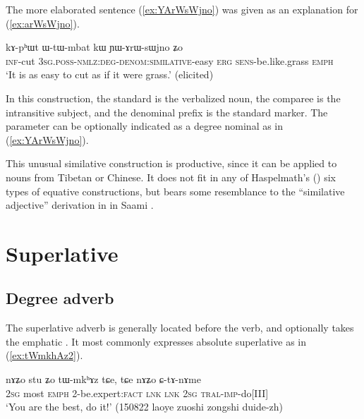 The more elaborated sentence (\ref{ex:YArWsWjno}) was given as an explanation for (\ref{ex:arWsWjno}).

\begin{exe}
	\ex \label{ex:YArWsWjno}
	\gll  kɤ-pʰɯt ɯ-tɯ-mbat kɯ ɲɯ-ɤrɯ-sɯjno ʑo \\
	\textsc{inf}-cut  \textsc{3sg}.\textsc{poss}-\textsc{nmlz}:\textsc{deg}-\textsc{denom}:\textsc{similative}-easy \textsc{erg} \textsc{sens}-be.like.grass \textsc{emph} \\
	\glt `It is as easy to cut as if it were grass.' (elicited)
\end{exe}

In this construction, the standard is the verbalized noun, the comparee is the intransitive subject, and the denominal prefix  is the standard marker. The parameter can be optionally indicated as a degree nominal as in (\ref{ex:YArWsWjno}).

This unusual similative construction is productive, since it can be applied to nouns from Tibetan or Chinese. It does not fit in any of Haspelmath's (\citeyear{haspelmath17equative}) six types of equative constructions, but bears some resemblance to the ``similative adjective'' derivation in  in Saami \citep[5.1]{ylikovski17similarity}. 


\section{Superlative} \label{sec:superlative}

 \subsection{Degree adverb} \label{sec:stu.superlative}
The superlative adverb  is generally located before the verb, and optionally takes the emphatic . It most commonly expresses absolute superlative as in  (\ref{ex:tWmkhAz2}).
 

 \begin{exe}
\ex \label{ex:tWmkhAz2}
\gll nɤʑo stu ʑo tɯ-mkʰɤz tɕe, tɕe nɤʑo ɕ-tɤ-nɤme \\
\textsc{2sg} most \textsc{emph} 2-be.expert:\textsc{fact}   \textsc{lnk} \textsc{lnk} \textsc{2sg} \textsc{tral}-\textsc{imp}-do[III] \\
\glt `You are the best, do it!' (150822 laoye zuoshi zongshi duide-zh)
\end{exe}

